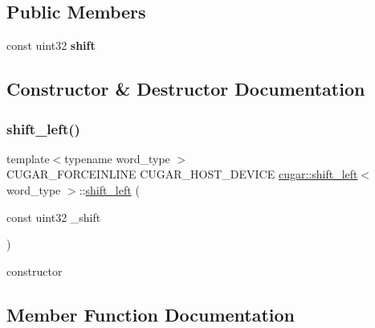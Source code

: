 \subsection*{Public Members}
\begin{DoxyCompactItemize}
\item 
\mbox{\label{structcugar_1_1shift__left_ae675e1786bf19fd7d445f3197706d2b6}} 
const uint32 {\bfseries shift}
\end{DoxyCompactItemize}


\subsection{Constructor \& Destructor Documentation}
\mbox{\label{structcugar_1_1shift__left_ac08dd371669fbc3edc074da446fe43ed}} 
\subsubsection{\texorpdfstring{shift\+\_\+left()}{shift\_left()}}
{\footnotesize\ttfamily template$<$typename word\+\_\+type $>$ \\
C\+U\+G\+A\+R\+\_\+\+F\+O\+R\+C\+E\+I\+N\+L\+I\+NE C\+U\+G\+A\+R\+\_\+\+H\+O\+S\+T\+\_\+\+D\+E\+V\+I\+CE \hyperlink{structcugar_1_1shift__left}{cugar\+::shift\+\_\+left}$<$ word\+\_\+type $>$\+::\hyperlink{structcugar_1_1shift__left}{shift\+\_\+left} (\begin{DoxyParamCaption}\item[{const uint32}]{\+\_\+shift }\end{DoxyParamCaption})\hspace{0.3cm}{\ttfamily [inline]}}

constructor 

\subsection{Member Function Documentation}
\mbox{\label{structcugar_1_1shift__left_a2ae090773d0a7f31c926cf1331163bf1}} 

